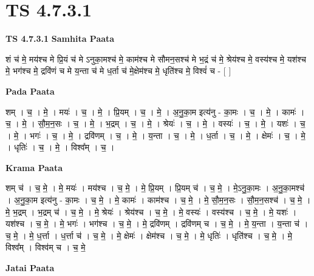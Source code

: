 \documentclass[17pt]{extarticle}
\begin{document}
\section{ TS 4.7.3.1 }

\textbf{TS 4.7.3.1 } \newline
\textbf{Samhita Paata} \newline

शं च॑ मे॒ मय॑श्च मे प्रि॒यं च॑ मे ऽनुका॒मश्च॑ मे॒ काम॑श्च मे     सौमन॒सश्च॑ मे भ॒द्रं च॑ मे॒ श्रेय॑श्च मे॒ वस्य॑श्च मे॒   यश॑श्च मे॒ भग॑श्च मे॒ द्रवि॑णं च मे य॒न्ता च॑ मे ध॒र्ता च॑ मे॒क्षेम॑श्च मे॒ धृति॑श्च मे॒ विश्वं॑ च - [  ] \newline

\textbf{Pada Paata} \newline

शम् । च॒ । मे॒ । मयः॑ । च॒ । मे॒ । प्रि॒यम् । च॒ । मे॒ । अ॒नु॒का॒म इत्य॑नु - का॒मः । च॒ । मे॒ । कामः॑ । च॒ । मे॒ । सौ॒म॒न॒सः । च॒ । मे॒ । भ॒द्रम् । च॒ । मे॒ । श्रेयः॑ । च॒ । मे॒ । वस्यः॑ । च॒ । मे॒ । यशः॑ । च॒ । मे॒ । भगः॑ । च॒ । मे॒ । द्रवि॑णम् । च॒ । मे॒ । य॒न्ता । च॒ । मे॒ । ध॒र्ता । च॒ । मे॒ । क्षेमः॑ । च॒ । मे॒ । धृतिः॑ । च॒ । मे॒ । विश्व᳚म् । च॒ ।  \newline


\textbf{Krama Paata} \newline

शम् च॑ । च॒ मे॒ । मे॒ मयः॑ । मय॑श्च । च॒ मे॒ । मे॒ प्रि॒यम् । प्रि॒यम् च॑ । च॒ मे॒ । मे॒ऽनु॒का॒मः । अ॒नु॒का॒मश्च॑ । अ॒नु॒का॒म इत्य॑नु - का॒मः । च॒ मे॒ । मे॒ कामः॑ । काम॑श्च । च॒ मे॒ । मे॒ सौ॒म॒न॒सः । सौ॒म॒न॒सश्च॑ । च॒ मे॒ । मे॒ भ॒द्रम् । भ॒द्रम् च॑ । च॒ मे॒ । मे॒ श्रेयः॑ । श्रेय॑श्च । च॒ मे॒ । मे॒ वस्यः॑ । वस्य॑श्च । च॒ मे॒ । मे॒ यशः॑ । यश॑श्च । च॒ मे॒ । मे॒ भगः॑ । भग॑श्च । च॒ मे॒ । मे॒ द्रवि॑णम् । द्रवि॑णम् च । च॒ मे॒ । मे॒ य॒न्ता । य॒न्ता च॑ । च॒ मे॒ । मे॒ ध॒र्त्ता । ध॒र्त्ता च॑ । च॒ मे॒ । मे॒ क्षेमः॑ । क्षेम॑श्च । च॒ मे॒ । मे॒ धृतिः॑ । धृति॑श्च । च॒ मे॒ । मे॒ विश्व᳚म् । विश्व॑म् च । च॒ मे॒ \newline

\textbf{Jatai Paata} \newline
\end{document}
